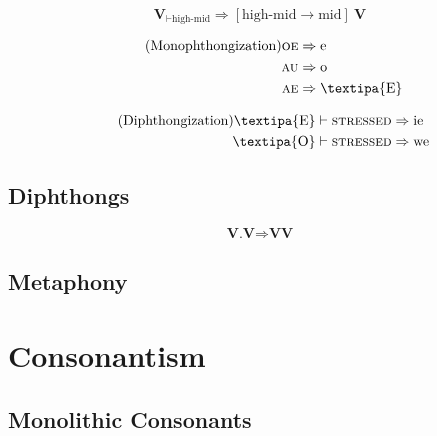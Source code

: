 \documentclass{report}
\begin{document}
\begin{tcolorbox}[title=Pan-Romance Great Merger]
  \begin{equation}\tag{Great Merger}\label{eq:great_merger}
    \textbf{V}_{\vdash \text{high-mid}} \Rightarrow [\text{high-mid} \rightarrow \text{mid}]\ \textbf{V}
  \end{equation}
\end{tcolorbox}

\begin{tcolorbox}[title=Monophthongization]
  \begin{align*}\tag{Monophthongization}\label{eq:monophthongization}
    \textsc{oe} & \Rightarrow \text{e} \\
    \textsc{au} & \Rightarrow \text{o} \\
    \textsc{ae} & \Rightarrow \text{\textipa{E}} 
  \end{align*}
\end{tcolorbox}

\begin{tcolorbox}[title=Diphthongization]
  \begin{align*}\tag{Diphthongization}\label{eq:diphthongization}
      \text{\textipa{E}} \vdash \textsc{stressed} & \Rightarrow \text{ie} \\
      \text{\textipa{O}} \vdash \textsc{stressed} & \Rightarrow \text{we}
  \end{align*}
\end{tcolorbox}

\subsection{Diphthongs}

\begin{tcolorbox}[title=Loss of Hiatus]
  \begin{equation}\tag{Loss of Hiatus}\label{eq:loss_of_hiatus}
    \textbf{V.V} \Rightarrow \textbf{VV}
  \end{equation}
\end{tcolorbox}

\subsection{Metaphony}

\section{Consonantism}

\subsection{Monolithic Consonants}
\end{document}
